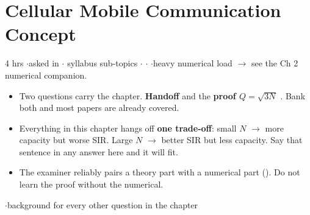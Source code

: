 \section{Cellular Mobile Communication Concept}

{\color{sub}\footnotesize 4 hrs \gap$\cdot$\gap asked in 
\gap$\cdot$ syllabus sub-topics \gap$\cdot$\gap {} \gap$\cdot$\gap {} \gap$\cdot$\gap heavy numerical load
$\rightarrow$ see the Ch 2 numerical companion.}

\begin{itemize}
  \item Two questions carry the chapter. \textbf{Handoff}  and the
        \textbf{proof $Q=\sqrt{3N}$} . Bank both and most papers are already covered.
  \item Everything in this chapter hangs off \textbf{one trade-off}: small $N$ $\rightarrow$ more
        capacity but worse SIR. Large $N$ $\rightarrow$ better SIR but less capacity. Say that
        sentence in any answer here and it will fit.
  \item The examiner reliably pairs a theory part with a numerical part
        (). Do not learn the proof
        without the numerical.
\end{itemize}

\hr


{\color{sub}\footnotesize {} \gap$\cdot$\gap background for every other question in the chapter}

